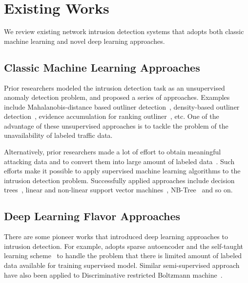 \section{Existing Works}

We review existing network intrusion detection systems that adopts
both classic machine learning and novel deep learning approaches.

\subsection{Classic Machine Learning Approaches}
Prior researchers modeled the intrusion detection task as an unsupervised
anomaly detection problem, and proposed a series of approaches.
Examples include Mahalanobis-distance based outliner detection~\cite{ComparativeAnomalyNIDS},
density-based outliner detection~\cite{LOF, ComparativeAnomalyNIDS},
evidence accumulation for ranking outliner~\cite{RankingOutliner}, etc.
One of the advantage of these unsupervised approaches is to tackle the problem of
the unavailability of labeled traffic data.

Alternatively, prior researchers made a lot of effort to obtain meaningful
attacking data and to convert them into large amount of labeled data~\cite{DARPA, KDDCup, NSL-KDD}.
Such efforts make it possible to apply supervised machine learning algorithms to the
intrusion detection problem.
Successfully applied approaches include decision trees~\cite{DecisionTree},
linear and non-linear support vector machines~\cite{SVM}, NB-Tree~\cite{NB-Tree} and so on.

\subsection{Deep Learning Flavor Approaches}
There are some pioneer works that introduced deep learning approaches to intrusion detection.
For example, \cite{STL-NIDS} adopts sparse autoencoder and the self-taught learning
scheme~\cite{SparseAE} to handle the problem that there is limited amount of labeled data
available for training supervised model.
Similar semi-supervised approach have also been applied to
Discriminative restricted Boltzmann machine~\cite{AnomalyDetectionRBM}.
